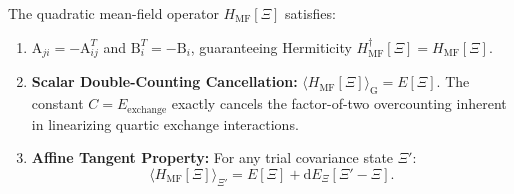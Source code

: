 \begin{theorem}
\label{thm:m1_2_hfb_properties}
The quadratic mean-field operator $H_{\mathrm{MF}}[\Xi]$ satisfies:
\begin{enumerate}
\item $\mathrm{A}_{ji} = -\mathrm{A}_{ij}^T$ and $\mathrm{B}_i^T = -\mathrm{B}_i$, guaranteeing Hermiticity $H_{\mathrm{MF}}^\dagger[\Xi] = H_{\mathrm{MF}}[\Xi]$.
\item \textbf{Scalar Double-Counting Cancellation:} $\langle H_{\mathrm{MF}}[\Xi] \rangle_{\mathrm{G}} = E[\Xi]$. The constant $C = E_{\mathrm{exchange}}$ exactly cancels the factor-of-two overcounting inherent in linearizing quartic exchange interactions.
\item \textbf{Affine Tangent Property:} For any trial covariance state $\Xi'$:
\begin{equation}
\label{eq:m1_2_tangent_property}
\langle H_{\mathrm{MF}}[\Xi] \rangle_{\Xi'} = E[\Xi] + \mathrm{d}E_\Xi[\Xi' - \Xi].
\end{equation}
\end{enumerate}
\end{theorem}
